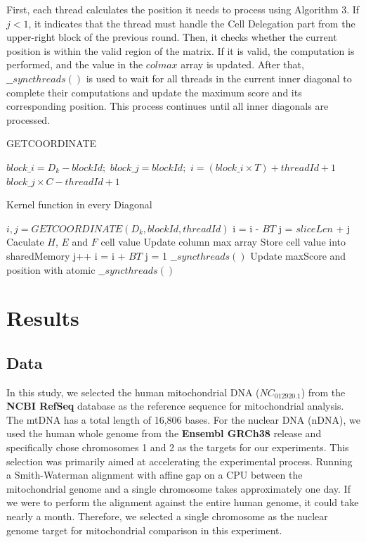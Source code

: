 \documentclass[PhD]{PHlab-thesis}
\begin{document}
First, each thread calculates the position it needs to process using Algorithm 3. If $j < 1$, it indicates that the thread must handle the Cell Delegation part from the upper-right block of the previous round. Then, it checks whether the current position is within the valid region of the matrix. If it is valid, the computation is performed, and the value in the $colmax$ array is updated. After that, $\_\_syncthreads()$ is used to wait for all threads in the current inner diagonal to complete their computations and update the maximum score and its corresponding position. This process continues until all inner diagonals are processed.
\begin{algorithm}
\caption{GETCOORDINATE}
\begin{algorithmic}
\Procedure{}{}
    \State $block\_i = D_k - blockId;$
    \State $block\_j = blockId;$
    \State $i = (block\_i \times T) + threadId + 1$
    \State $block\_j \times C - threadId + 1$
\EndProcedure
\end{algorithmic}
\end{algorithm}
\begin{algorithm}
\caption{Kernel function in every Diagonal}
\begin{algorithmic}[1]
    \State \textbf{$i, j = GETCOORDINATE(D_k, blockId, threadId)$}
        \State i = i - $B$\times$T$
        \State j = $sliceLen$ + j
    \EndIf
            \State Caculate $H$, $E$ and $F$ cell value
            \State Update column max array
            \State Store cell value into sharedMemory
        \EndIf
        \State j++
            \State i = i + $B$\times$T$
            \State j = 1
        \EndIf
        \State $\_\_syncthreads()$
        \State Update maxScore and position with atomic
        \State $\_\_syncthreads()$
    \EndFor
\EndProcedure
\end{algorithmic}
\end{algorithm}

\chapter{Results}
\section{Data}
In this study, we selected the human mitochondrial DNA ($NC_012920.1$) from the \textbf{NCBI RefSeq} database as the reference sequence for mitochondrial analysis. The mtDNA has a total length of 16,806 bases. For the nuclear DNA (nDNA), we used the human whole genome from the \textbf{Ensembl GRCh38} release and specifically chose chromosomes 1 and 2 as the targets for our experiments. This selection was primarily aimed at accelerating the experimental process. Running a Smith-Waterman alignment with affine gap on a CPU between the mitochondrial genome and a single chromosome takes approximately one day. If we were to perform the alignment against the entire human genome, it could take nearly a month. Therefore, we selected a single chromosome as the nuclear genome target for mitochondrial comparison in this experiment.
\end{document}
